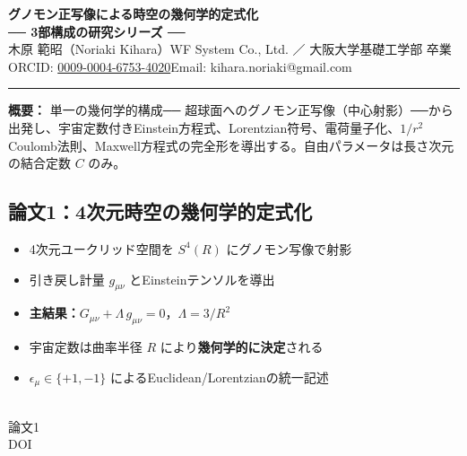 \documentclass[11pt,a4paper]{ltjsarticle}
\begin{document}
\begin{center}
{\Large\bfseries グノモン正写像による時空の幾何学的定式化}\\[8pt]
{\large\bfseries ── 3部構成の研究シリーズ ──}\\[12pt]
{\normalsize 木原 範昭（Noriaki Kihara）\quad WF System Co., Ltd. ／ 大阪大学基礎工学部 卒業}\\[3pt]
{\small ORCID: \href{https://orcid.org/0009-0004-6753-4020}{0009-0004-6753-4020}\qquad Email: kihara.noriaki@gmail.com}
\end{center}

\vspace{6pt}
\hrule
\vspace{8pt}

\noindent\textbf{概要：}
単一の幾何学的構成── 超球面へのグノモン正写像（中心射影）──から出発し、宇宙定数付きEinstein方程式、Lorentzian符号、電荷量子化、$1/r^2$ Coulomb法則、Maxwell方程式の完全形を導出する。自由パラメータは長さ次元の結合定数 $C$ のみ。

\vspace{10pt}

\noindent\begin{minipage}[t]{0.82\textwidth}
\subsection*{論文1：4次元時空の幾何学的定式化}
\vspace{-6pt}
\begin{itemize}
\item 4次元ユークリッド空間を $S^4(R)$ にグノモン写像で射影
\item 引き戻し計量 $g_{\mu\nu}$ とEinsteinテンソルを導出
\item \textbf{主結果：}$G_{\mu\nu} + \Lambda\, g_{\mu\nu} = 0$，$\Lambda = 3/R^2$
\item 宇宙定数は曲率半径 $R$ により\textbf{幾何学的に決定}される
\item $\epsilon_\mu \in \{+1,-1\}$ によるEuclidean/Lorentzianの統一記述
\end{itemize}
\end{minipage}%
\hfill
\begin{minipage}[t]{0.15\textwidth}
\vspace{0pt}
\centering
{}\\[3pt]
{\scriptsize 論文1\\DOI}
\end{minipage}
\end{document}
